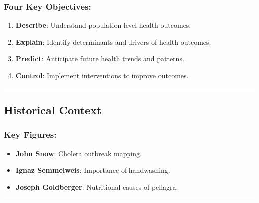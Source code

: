 \documentclass[
  letterpaper,
  DIV=11,
  numbers=noendperiod]{scrartcl}
\providecommand{\tightlist}{%
  \setlength{\itemsep}{0pt}\setlength{\parskip}{0pt}}\usepackage{longtable,booktabs,array}
\begin{document}
\hypertarget{four-key-objectives}{%
\subsubsection{\texorpdfstring{{\textbf{Four Key
Objectives}}:}{Four Key Objectives:}}\label{four-key-objectives}}

\begin{enumerate}
\def\labelenumi{\arabic{enumi}.}
\tightlist
\item
  \textbf{Describe}: Understand population-level health outcomes.\\
\item
  \textbf{Explain}: Identify determinants and drivers of health
  outcomes.\\
\item
  \textbf{Predict}: Anticipate future health trends and patterns.\\
\item
  \textbf{Control}: Implement interventions to improve outcomes.
\end{enumerate}

\begin{center}\rule{0.5\linewidth}{0.5pt}\end{center}

\hypertarget{historical-context}{%
\subsection{\texorpdfstring{{\textbf{Historical
Context}}}{Historical Context}}\label{historical-context}}

\hypertarget{key-figures}{%
\subsubsection{\texorpdfstring{{\textbf{Key
Figures}}:}{Key Figures:}}\label{key-figures}}

\begin{itemize}
\tightlist
\item
  \textbf{John Snow}: Cholera outbreak mapping.\\
\item
  \textbf{Ignaz Semmelweis}: Importance of handwashing.\\
\item
  \textbf{Joseph Goldberger}: Nutritional causes of pellagra.
\end{itemize}

\begin{center}\rule{0.5\linewidth}{0.5pt}\end{center}
\end{document}

